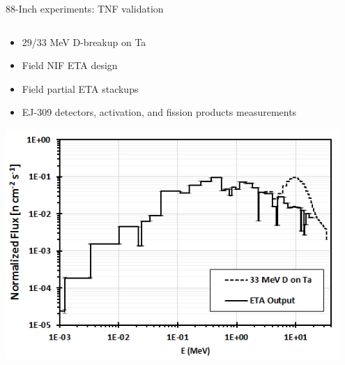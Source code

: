 \documentclass[xcolor=x11names,compress]{beamer}
\renewcommand{\(}{\begin{columns}}
\renewcommand{\)}{\end{columns}}
\newcommand{\<}[1]{\begin{column}{#1}}
\renewcommand{\>}{\end{column}}
\begin{document}
\begin{frame}{88-Inch experiments: TNF validation}
      \begin{columns}
        \begin{column}{0.55\linewidth}
          \begin{itemize}
            \item 29/33 MeV D-breakup on Ta
            \item Field NIF ETA design
            \item Field partial ETA stackups
            \item EJ-309 detectors, activation, and fission products measurements 
          \end{itemize}
          \includegraphics[width=0.95\textwidth]{../figs/33MeVTa_OutputComp.png}
        \end{column}
        

\end{columns}
\end{frame}
\end{document}
